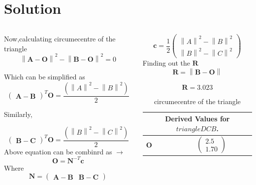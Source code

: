 \documentclass{beamer}
\newcommand\norm[1]{\left\lVert#1\right\rVert}
\renewcommand{\vec}[1]{\mathbf{#1}}
\begin{document}
\section*{\textbf{Solution}}
\begin{frame}[fragile]
\footnotesize
\begin{columns}
\begin{column}{0.5\textwidth}
	Now,calculating circumecentre of the triangle
	\\ 
	$$\norm{\vec{A}-\vec{O}}^2 - \norm{\vec{B}-\vec{O}}^2 = 0$$
	\\
	Which can be simplified as
	$${\begin{pmatrix}\vec{A}-\vec{B}\end{pmatrix}}^T \vec{O} = \frac{(\norm{A}^2 -\norm{B}^2)}{2}$$

	Similarly,

	$${\begin{pmatrix}\vec{B}-\vec{C}\end{pmatrix}}^T \vec{O}  = \frac{(\norm{B}^2 -\norm{C}^2)}{2}$$
   Above equation can be combinrd as $\to$
   \\
   $$\vec{O} = \vec{N}^{-T} \vec{c}$$
	Where
	\begin{equation}
	\vec{N} = \begin{pmatrix}\vec{A} -\vec{B} & \vec{B}-\vec{C}\end{pmatrix}
	\end{equation}
	\end{column}

	\begin{column}{0.5\textwidth}
	$$\vec{c} = \frac{1}{2}\begin{pmatrix}\norm{A}^2 -\norm{B}^2 \\ \norm{B}^2 - \norm{C}^2\end{pmatrix}$$
	Finding out the $\vec{R}$
	\\
	$$\vec{R} = \norm{\vec{B}- \vec{O}}$$
	\\
	$$\vec{R} = 3.023$$
	
	\begin{table}[H]
	\centering
	\resizebox{1\textwidth}{!}
	{\begin{minipage}{\textwidth}
		\begin{tabular}{ |p{2cm}|p{2cm}|  }
			\hline
			\multicolumn{2}{|c|}{Derived Values for $triangle DCB$.} \\
			\hline
			\centering
			$\vec{O}$ & $$\begin{pmatrix}2.5\\1.70\end{pmatrix}$$\\	\hline
			\end{tabular}
	\end{minipage}}
	\caption{\tiny circumecentre of the triangle}
\end{table}
\end{column}
\end{columns}
\end{frame}
\end{document}
